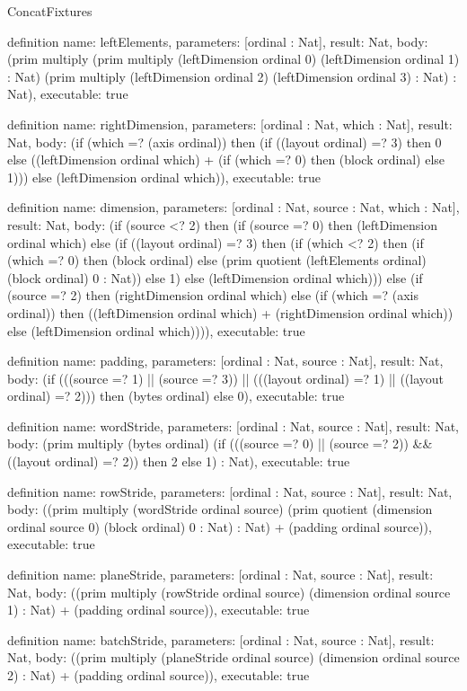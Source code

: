 \begin{lexlean}{ConcatFixtures}
\begin{semanticmodule}
definition{
  name: leftElements,
  parameters: [ordinal : Nat],
  result: Nat,
  body: (prim multiply (prim multiply (leftDimension ordinal 0) (leftDimension ordinal 1) : Nat) (prim multiply (leftDimension ordinal 2) (leftDimension ordinal 3) : Nat) : Nat),
  executable: true
}

definition{
  name: rightDimension,
  parameters: [ordinal : Nat, which : Nat],
  result: Nat,
  body: (if (which =? (axis ordinal)) then (if ((layout ordinal) =? 3) then 0 else ((leftDimension ordinal which) + (if (which =? 0) then (block ordinal) else 1))) else (leftDimension ordinal which)),
  executable: true
}

definition{
  name: dimension,
  parameters: [ordinal : Nat, source : Nat, which : Nat],
  result: Nat,
  body: (if (source <? 2) then (if (source =? 0) then (leftDimension ordinal which) else (if ((layout ordinal) =? 3) then (if (which <? 2) then (if (which =? 0) then (block ordinal) else (prim quotient (leftElements ordinal) (block ordinal) 0 : Nat)) else 1) else (leftDimension ordinal which))) else (if (source =? 2) then (rightDimension ordinal which) else (if (which =? (axis ordinal)) then ((leftDimension ordinal which) + (rightDimension ordinal which)) else (leftDimension ordinal which)))),
  executable: true
}

definition{
  name: padding,
  parameters: [ordinal : Nat, source : Nat],
  result: Nat,
  body: (if (((source =? 1) || (source =? 3)) || (((layout ordinal) =? 1) || ((layout ordinal) =? 2))) then (bytes ordinal) else 0),
  executable: true
}

definition{
  name: wordStride,
  parameters: [ordinal : Nat, source : Nat],
  result: Nat,
  body: (prim multiply (bytes ordinal) (if (((source =? 0) || (source =? 2)) && ((layout ordinal) =? 2)) then 2 else 1) : Nat),
  executable: true
}

definition{
  name: rowStride,
  parameters: [ordinal : Nat, source : Nat],
  result: Nat,
  body: ((prim multiply (wordStride ordinal source) (prim quotient (dimension ordinal source 0) (block ordinal) 0 : Nat) : Nat) + (padding ordinal source)),
  executable: true
}

definition{
  name: planeStride,
  parameters: [ordinal : Nat, source : Nat],
  result: Nat,
  body: ((prim multiply (rowStride ordinal source) (dimension ordinal source 1) : Nat) + (padding ordinal source)),
  executable: true
}

definition{
  name: batchStride,
  parameters: [ordinal : Nat, source : Nat],
  result: Nat,
  body: ((prim multiply (planeStride ordinal source) (dimension ordinal source 2) : Nat) + (padding ordinal source)),
  executable: true
}


\end{semanticmodule}
\end{lexlean}

